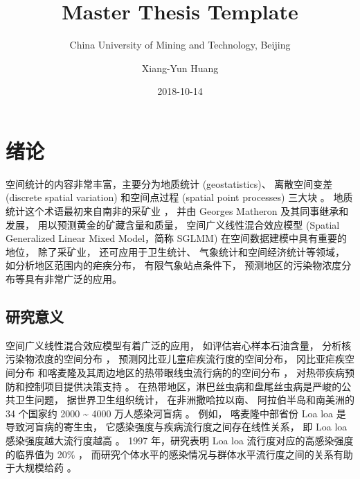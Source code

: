 \documentclass[12pt,a4paper,UTF8,twoside]{book}
\title{Master Thesis Template}
\subtitle{China University of Mining and Technology, Beijing}
\author{Xiang-Yun Huang}
\date{2018-10-14}
\theoremstyle{definition}
\theoremstyle{definition}
\theoremstyle{definition}
\theoremstyle{remark}
\begin{document}





{
\setcounter{tocdepth}{2}
\tableofcontents
}

\mainmatter

\hypertarget{intro}{%
\chapter{绪论}\label{intro}}

空间统计的内容非常丰富，主要分为地质统计 (geostatistics)、 离散空间变差
(discrete spatial variation) 和空间点过程 (spatial point processes)
三大块 \citep{Cressie1993}。 地质统计这个术语最初来自南非的采矿业
\citep{Krige1951}， 并由 Georges Matheron 及其同事继承和发展，
用以预测黄金的矿藏含量和质量， 空间广义线性混合效应模型 (Spatial
Generalized Linear Mixed Model，简称 SGLMM)
在空间数据建模中具有重要的地位， 除了采矿业， 还可应用于卫生统计、
气象统计和空间经济统计等领域， 如分析地区范围内的疟疾分布，
有限气象站点条件下， 预测地区的污染物浓度分布等具有非常广泛的应用。

\hypertarget{motivations}{%
\section{研究意义}\label{motivations}}

空间广义线性混合效应模型有着广泛的应用， 如评估岩心样本石油含量，
分析核污染物浓度的空间分布 \citep{Diggle1998}，
预测冈比亚儿童疟疾流行度的空间分布， 冈比亚疟疾空间分布
\citep{Thomson1999, Diggle2002Childhood}
和喀麦隆及其周边地区的热带眼线虫流行病的的空间分布
\citep{Diggle2007ATMP}， 对热带疾病预防和控制项目提供决策支持
\citep{Schl2016Using}。
在热带地区，淋巴丝虫病和盘尾丝虫病是严峻的公共卫生问题，
据世界卫生组织统计， 在非洲撒哈拉以南、 阿拉伯半岛和南美洲的 34 个国家约
2000 \textasciitilde{} 4000 万人感染河盲病 \citep{Takougang2002Rapid}。
例如， 喀麦隆中部省份 Loa loa 是导致河盲病的寄生虫，
它感染强度与疾病流行度之间存在线性关系， 即 Loa loa
感染强度越大流行度越高 \citep{Boussinesq2001}。 1997 年，研究表明 Loa
loa 流行度对应的高感染强度的临界值为 20\% \citep{Gardon1997Serious}，
而研究个体水平的感染情况与群体水平流行度之间的关系有助于大规模给药
\citep{Schl2016Using}。
\end{document}
